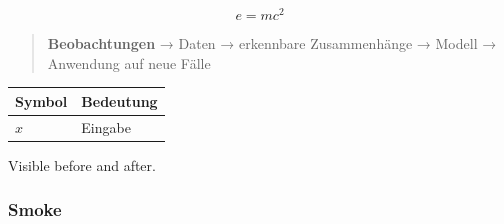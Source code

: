 \begin{equation}
e = mc^2
\end{equation}

\begin{quote}
\textbf{Beobachtungen} → Daten → erkennbare Zusammenhänge → Modell → Anwendung auf neue Fälle
\end{quote}

\par\addvspace{\medskipamount}
\noindent\begin{tabularx}{\linewidth}{@{}>{\raggedright\arraybackslash}X>{\raggedright\arraybackslash}X@{}}
\toprule
Symbol & Bedeutung \\
\midrule
$x$ & Eingabe \\
\bottomrule
\end{tabularx}
\par\addvspace{\medskipamount}

%
%
%
Visible before %
and after.

\begin{frame}[t]
\frametitle{Smoke}

\end{frame}

